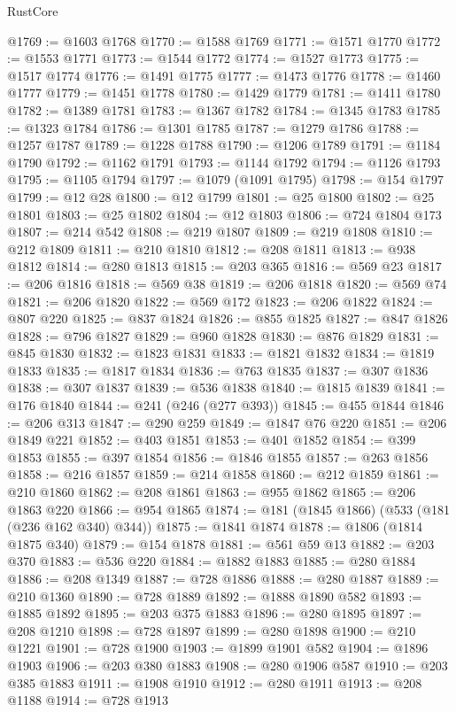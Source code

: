 \begin{lexlean}{RustCore}
\begin{coremodule}
@1769 := @1603 @1768
@1770 := @1588 @1769
@1771 := @1571 @1770
@1772 := @1553 @1771
@1773 := @1544 @1772
@1774 := @1527 @1773
@1775 := @1517 @1774
@1776 := @1491 @1775
@1777 := @1473 @1776
@1778 := @1460 @1777
@1779 := @1451 @1778
@1780 := @1429 @1779
@1781 := @1411 @1780
@1782 := @1389 @1781
@1783 := @1367 @1782
@1784 := @1345 @1783
@1785 := @1323 @1784
@1786 := @1301 @1785
@1787 := @1279 @1786
@1788 := @1257 @1787
@1789 := @1228 @1788
@1790 := @1206 @1789
@1791 := @1184 @1790
@1792 := @1162 @1791
@1793 := @1144 @1792
@1794 := @1126 @1793
@1795 := @1105 @1794
@1797 := @1079 (@1091 @1795)
@1798 := @154 @1797
@1799 := @12 @28
@1800 := @12 @1799
@1801 := @25 @1800
@1802 := @25 @1801
@1803 := @25 @1802
@1804 := @12 @1803
@1806 := @724 @1804 @173
@1807 := @214 @542
@1808 := @219 @1807
@1809 := @219 @1808
@1810 := @212 @1809
@1811 := @210 @1810
@1812 := @208 @1811
@1813 := @938 @1812
@1814 := @280 @1813
@1815 := @203 @365
@1816 := @569 @23
@1817 := @206 @1816
@1818 := @569 @38
@1819 := @206 @1818
@1820 := @569 @74
@1821 := @206 @1820
@1822 := @569 @172
@1823 := @206 @1822
@1824 := @807 @220
@1825 := @837 @1824
@1826 := @855 @1825
@1827 := @847 @1826
@1828 := @796 @1827
@1829 := @960 @1828
@1830 := @876 @1829
@1831 := @845 @1830
@1832 := @1823 @1831
@1833 := @1821 @1832
@1834 := @1819 @1833
@1835 := @1817 @1834
@1836 := @763 @1835
@1837 := @307 @1836
@1838 := @307 @1837
@1839 := @536 @1838
@1840 := @1815 @1839
@1841 := @176 @1840
@1844 := @241 (@246 (@277 @393))
@1845 := @455 @1844
@1846 := @206 @313
@1847 := @290 @259
@1849 := @1847 @76 @220
@1851 := @206 @1849 @221
@1852 := @403 @1851
@1853 := @401 @1852
@1854 := @399 @1853
@1855 := @397 @1854
@1856 := @1846 @1855
@1857 := @263 @1856
@1858 := @216 @1857
@1859 := @214 @1858
@1860 := @212 @1859
@1861 := @210 @1860
@1862 := @208 @1861
@1863 := @955 @1862
@1865 := @206 @1863 @220
@1866 := @954 @1865
@1874 := @181 (@1845 @1866) (@533 (@181 (@236 @162 @340) @344))
@1875 := @1841 @1874
@1878 := @1806 (@1814 @1875 @340)
@1879 := @154 @1878
@1881 := @561 @59 @13
@1882 := @203 @370
@1883 := @536 @220
@1884 := @1882 @1883
@1885 := @280 @1884
@1886 := @208 @1349
@1887 := @728 @1886
@1888 := @280 @1887
@1889 := @210 @1360
@1890 := @728 @1889
@1892 := @1888 @1890 @582
@1893 := @1885 @1892
@1895 := @203 @375 @1883
@1896 := @280 @1895
@1897 := @208 @1210
@1898 := @728 @1897
@1899 := @280 @1898
@1900 := @210 @1221
@1901 := @728 @1900
@1903 := @1899 @1901 @582
@1904 := @1896 @1903
@1906 := @203 @380 @1883
@1908 := @280 @1906 @587
@1910 := @203 @385 @1883
@1911 := @1908 @1910
@1912 := @280 @1911
@1913 := @208 @1188
@1914 := @728 @1913

\end{coremodule}
\end{lexlean}
